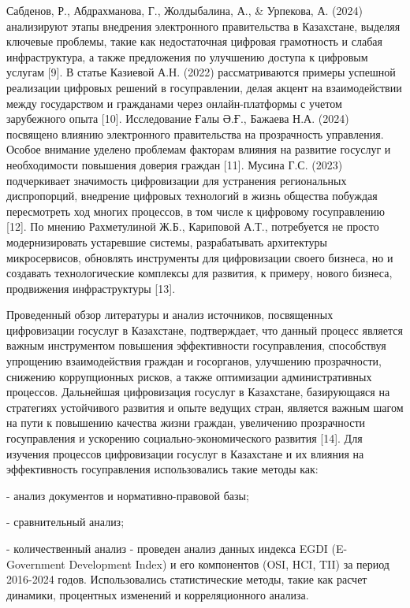 \begin{multicols}{2}
Сабденов, Р., Абдрахманова, Г., Жолдыбалина, А., \& Урпекова, А. (2024)
анализируют этапы внедрения электронного правительства в Казахстане,
выделяя ключевые проблемы, такие как недостаточная цифровая грамотность
и слабая инфраструктура, а также предложения по улучшению доступа к
цифровым услугам {[}9{]}. В статье Казиевой А.Н. (2022) рассматриваются
примеры успешной реализации цифровых решений в госуправлении, делая
акцент на взаимодействии между государством и гражданами через
онлайн-платформы с учетом зарубежного опыта {[}10{]}. Исследование Ғалы
Ә.Ғ., Бажаева Н.А. (2024) посвящено влиянию электронного правительства
на прозрачность управления. Особое внимание уделено проблемам факторам
влияния на развитие госуслуг и необходимости повышения доверия граждан
{[}11{]}. Мусина Г.С. (2023) подчеркивает значимость цифровизации для
устранения региональных диспропорций, внедрение цифровых технологий в
жизнь общества побуждая пересмотреть ход многих процессов, в том числе к
цифровому госуправлению {[}12{]}. По мнению Рахметулиной Ж.Б., Кариповой
А.Т., потребуется не просто модернизировать устаревшие системы,
разрабатывать архитектуры микросервисов, обновлять инструменты для
цифровизации своего бизнеса, но и создавать технологические комплексы
для развития, к примеру, нового бизнеса, продвижения инфраструктуры
{[}13{]}.

Проведенный обзор литературы и анализ источников, посвященных
цифровизации госуслуг в Казахстане, подтверждает, что данный процесс
является важным инструментом повышения эффективности госуправления,
способствуя упрощению взаимодействия граждан и госорганов, улучшению
прозрачности, снижению коррупционных рисков, а также оптимизации
административных процессов. Дальнейшая цифровизация госуслуг в
Казахстане, базирующаяся на стратегиях устойчивого развития и опыте
ведущих стран, является важным шагом на пути к повышению качества жизни
граждан, увеличению прозрачности госуправления и ускорению
социально-экономического развития {[}14{]}. Для изучения процессов
цифровизации госуслуг в Казахстане и их влияния на эффективность
госуправления использовались такие методы как:

- анализ документов и нормативно-правовой базы;

- сравнительный анализ;

- количественный анализ - проведен анализ данных индекса EGDI
(E-Government Development Index) и его компонентов (OSI, HCI, TII) за
период 2016-2024 годов. Использовались статистические методы, такие как
расчет динамики, процентных изменений и корреляционного анализа.
\end{multicols}

